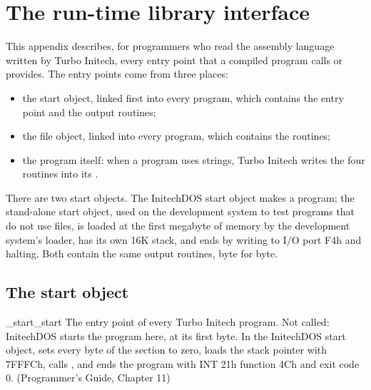 \NoLetterTabs
\chapter{The run-time library interface}

This appendix describes, for programmers who read the assembly language
written by Turbo Initech, every entry point that a compiled program calls
or provides.  The entry points come from three places:

\begin{itemize}
\item the start object, linked first into every program, which contains
  the entry point  and the output routines;
\item the file object, linked into every program, which contains the
   routines;
\item the program itself: when a program uses strings, Turbo Initech writes
  the four  routines into its .
\end{itemize}

There are two start objects.  The InitechDOS start object makes a
 program; the stand-alone start object, used on the development
system to test programs that do not use files, is loaded at the first
megabyte of memory by the development system's loader, has its own 16K
stack, and ends by writing to I/O port F4h and halting.  Both contain the
same output routines, byte for byte.

\section{The start object}

\begin{RtlEntry}{_start}{\_start}
\LFunction The entry point of every Turbo Initech program.
\LCalling Not called: InitechDOS starts the program here, at its first byte.
\LRemarks In the InitechDOS start object,  sets every byte of
the  section to zero, loads the stack pointer with 7FFFCh, calls
, and ends the program with INT 21h function 4Ch and
exit code 0.
\LSeeAlso {} (Programmer's Guide, Chapter 11)
\end{RtlEntry}

